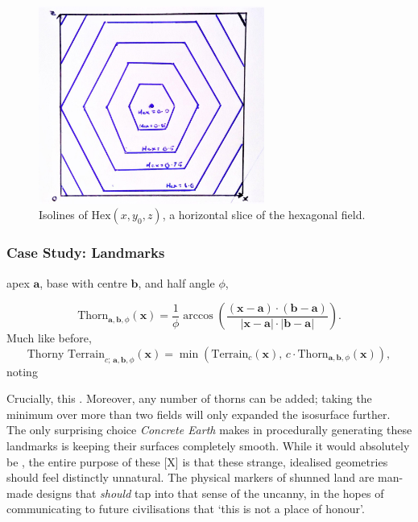 \documentclass[a4paper, 11pt]{article}
\begin{document}
\begin{flushleft}
\vspace{5pt}\noindent
\begin{figure}[t]
\centering
\includegraphics[width=0.66\textwidth]{Hex Field}
\caption{Isolines of $\textrm{Hex}(x,y_0,z)$, a horizontal slice of the hexagonal field.}
\label{Hex Field}
\end{figure}

\subsubsection{Case Study: Landmarks}

apex $\mathbf{a}$, base with centre $\mathbf{b}$, and half angle $\phi$,

$$\textrm{Thorn}_{\mathbf{a},\mathbf{b},\phi}(\mathbf{x}) = \frac{1}{\phi}\arccos\left(\frac{\left(\mathbf{x}-\mathbf{a}\right)\cdot\left(\mathbf{b}-\mathbf{a}\right)}{\left|\mathbf{x}-\mathbf{a}\right|\cdot\left|\mathbf{b}-\mathbf{a}\right|}\right).$$
Much like before,
$$\textrm{Thorny Terrain}_{c;\,\mathbf{a},\mathbf{b},\phi}(\mathbf{x}) = \min\left(\textrm{Terrain}_c(\mathbf{x}), \, c\cdot\textrm{Thorn}_{\mathbf{a},\mathbf{b},\phi}(\mathbf{x})\right),$$
noting %


\vspace{5pt}\noindent
Crucially, this  . Moreover, any number of thorns can be added; taking the minimum over more than two fields will only expanded the isosurface further. The only surprising choice \textit{Concrete Earth} makes in procedurally generating these landmarks is keeping their surfaces completely smooth. While it would absolutely be , the entire purpose of these [X] is that these strange, idealised geometries should feel distinctly unnatural. The physical markers of shunned land are man-made designs that \textit{should} tap into that sense of the uncanny, in the hopes of communicating to future civilisations that `this is not a place of honour'.  %


\end{flushleft}
\end{document}

